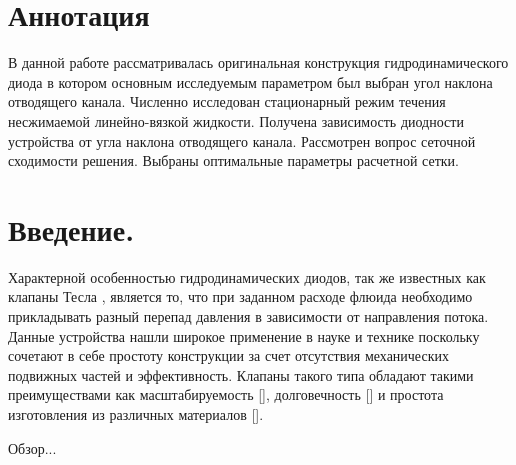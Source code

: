 \documentclass[14pt,a4paper]{article}
\begin{document}
    
    \section*{Аннотация}

        В данной работе рассматривалась оригинальная конструкция гидродинамического диода в котором основным исследуемым параметром был выбран угол наклона отводящего канала. Численно исследован стационарный режим течения несжимаемой линейно-вязкой жидкости. Получена зависимость диодности устройства от угла наклона отводящего канала. Рассмотрен вопрос сеточной сходимости решения. Выбраны оптимальные параметры расчетной сетки.

    \section*{Введение.}

        Характерной особенностью гидродинамических диодов, так же известных как клапаны Тесла \cite{JIN20188888}, является то, что при заданном расходе флюида необходимо прикладывать разный перепад давления в зависимости от направления потока. Данные устройства нашли широкое применение в науке и технике поскольку сочетают в себе простоту конструкции за счет отсутствия механических подвижных частей и эффективность. Клапаны такого типа обладают такими преимуществами как масштабируемость [], долговечность [] и простота изготовления из различных материалов [].

        Обзор...



\end{document}
